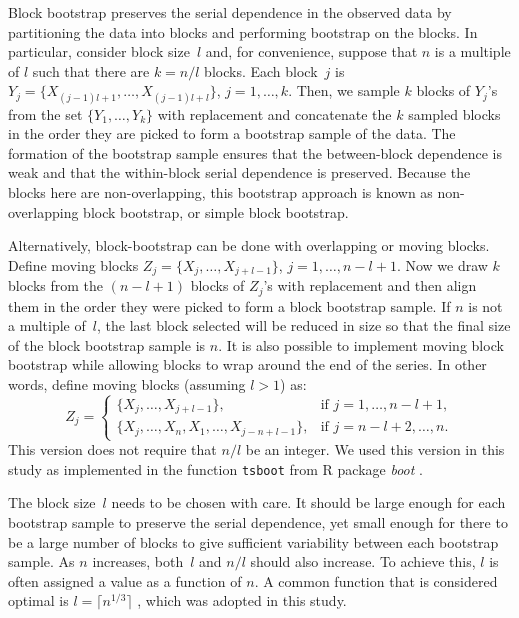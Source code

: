 \documentclass[12pt, letterpaper, titlepage]{article}
\begin{document}
Block bootstrap preserves the serial dependence in the observed data by
partitioning the data into blocks and performing bootstrap on the blocks.
In particular, consider block size~$l$ and, for convenience, suppose that
$n$ is a multiple of $l$ such that there are $k = n / l$ blocks. Each block~$j$
is $Y_j = \{X_{(j - 1) l + 1}, \ldots, X_{(j - 1) l + l}\}$,
$j = 1, \ldots,   k$.  Then, we sample $k$ blocks of $Y_j$'s from the set 
$\{Y_1, \ldots, Y_k\}$ with replacement and concatenate the $k$ sampled blocks
in the order they are picked to form a bootstrap sample of the data. The
formation of the bootstrap sample ensures that the between-block dependence is
weak and that the within-block serial dependence is preserved. Because the
blocks here are non-overlapping, this bootstrap approach is known as
non-overlapping block bootstrap, or simple block bootstrap.


Alternatively, block-bootstrap can be done with overlapping or moving blocks.
Define moving blocks $Z_j = \{X_j, \ldots, X_{j + l - 1}\}$,
$j = 1, \ldots, n - l + 1$. Now we draw $k$ blocks from the $(n - l + 1)$
blocks
of $Z_j$'s with replacement and then align them in the order they were
picked
to form a block bootstrap sample. If $n$ is not a multiple of~$l$, the last
block selected will be reduced in size so that the final size of the
block bootstrap sample is $n$. It is also possible to implement moving block
bootstrap while allowing blocks to wrap around the end of the series. In other
words, define moving blocks (assuming $l > 1$) as:
\begin{equation}
Z_j =
    \begin{cases}
        \{X_j, \ldots, X_{j + l - 1}\}, & \text{if } j = 1, \dots, n - l + 1,\\
        \{X_j, \ldots, X_n, X_1, \ldots, X_{j-n+l-1}\}, & \text{if } j = n - l
        + 2 ,\dots, n.
    \end{cases}
\end{equation}
This version does not require that $n/l$ be an integer.
We used this version in this study as implemented in the function
\texttt{tsboot} from R package \textsl{boot} \citep{boot}.


The block size~$l$ needs to be chosen with care. It should be large enough for
each bootstrap sample to preserve the serial dependence, yet small enough for
there to be a large number of blocks to give sufficient variability between
each bootstrap sample. As $n$ increases, both~$l$
and $n / l$ should also increase. To achieve this, $l$ is
often assigned a value as a function of $n$. A common function that is
considered optimal is $l = \lceil n^{1/3} \rceil$
\citep{buhlmann1999block}, which was adopted in this study.
\end{document}
